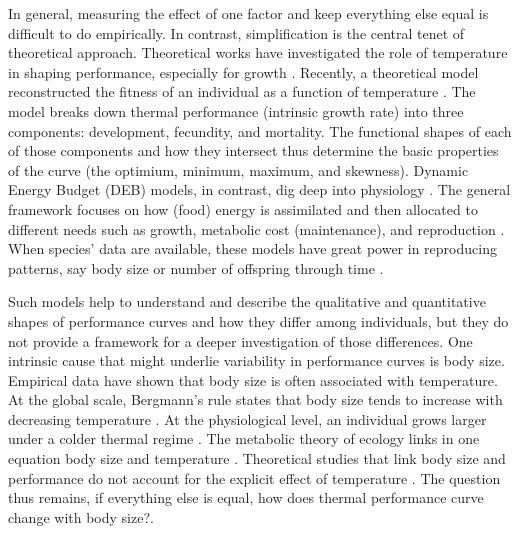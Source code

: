 In general, measuring the effect of one factor and keep everything else equal  is difficult to do empirically. %
In contrast, simplification is the central tenet of theoretical approach.
Theoretical works have investigated the role of temperature in shaping performance, especially for growth \citep{VandH1996, Kozlowski2004}.
Recently, a theoretical model reconstructed the fitness of an individual as a function of temperature \citep{Amarasekare2012}.
The model  breaks down thermal performance (intrinsic growth rate)  into three components: development, fecundity, and mortality.
The functional shapes of each of those components and how they intersect thus determine the basic properties of the curve (the optimium, minimum, maximum, and skewness).
Dynamic Energy Budget (DEB) models, in contrast, dig deep into physiology \citep{Kooijman2009}. %
The general framework focuses on how (food) energy is assimilated and then allocated to different needs such as growth, metabolic cost (maintenance), and reproduction \citep{Kooijman2009}.
When species'  data are available, these models have great power in reproducing patterns, say body size or number of offspring through time \citep{Nisbet2000}. 

Such models help to understand and describe the qualitative and quantitative shapes of performance curves and how they differ among individuals, but they do not provide a framework for a deeper investigation of those differences.
One intrinsic cause that might underlie variability in performance curves is body size.
Empirical data have shown that body size is often associated with temperature.  
At the global scale, Bergmann's rule states that body size tends to increase with decreasing temperature \citep{Bergmann1847}.
At the physiological level, an individual grows larger under a colder thermal regime \citep{Van1996}.
The metabolic theory of ecology links in one equation body size and temperature \citep{Gillooly2001}.
Theoretical studies that link body size and performance do not account for the explicit effect of temperature \citep[e.g.,][]{Yodzis1992, Brown1993}.
The question thus remains, if everything else is equal, how does thermal performance curve change with body size?. %

